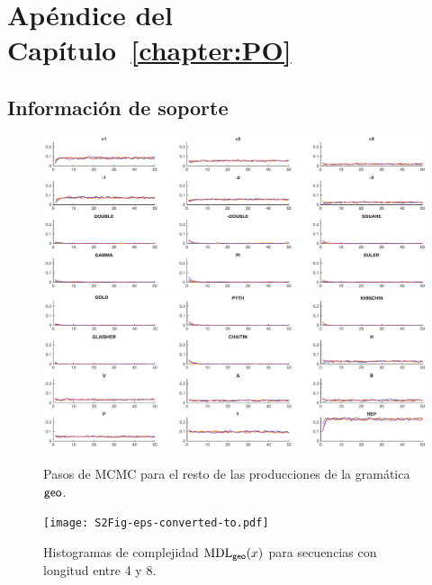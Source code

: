 
\chapter{Apéndice del Capítulo~\ref{chapter:PO}}\label{app:PO}

\newpage
\section{Información de soporte}

\begin{figure}[h!]
    \centering
    \hbox{\hspace{-2.5em}\includegraphics[width=1.2\textwidth]{figuras/plosone/S1Fig-eps-converted-to-a.pdf}}
    \hbox{\hspace{-2.5em}\includegraphics[width=1.2\textwidth]{figuras/plosone/S1Fig-eps-converted-to-b.pdf}}
    \caption{Pasos de MCMC para el resto de las producciones de la gramática ${\sf geo}$.}
    \label{S1_Fig}
\end{figure}

\begin{figure}[h!]
    \centering
    \hbox{\hspace{-2.5em}\texttt{[image: S2Fig-eps-converted-to.pdf]}}
    \caption{Histogramas de complejidad ${\rm MDL}_{{\sf geo}}(x)$ para secuencias con longitud entre 4 y 8.}
    \label{S2_Fig}
\end{figure}

